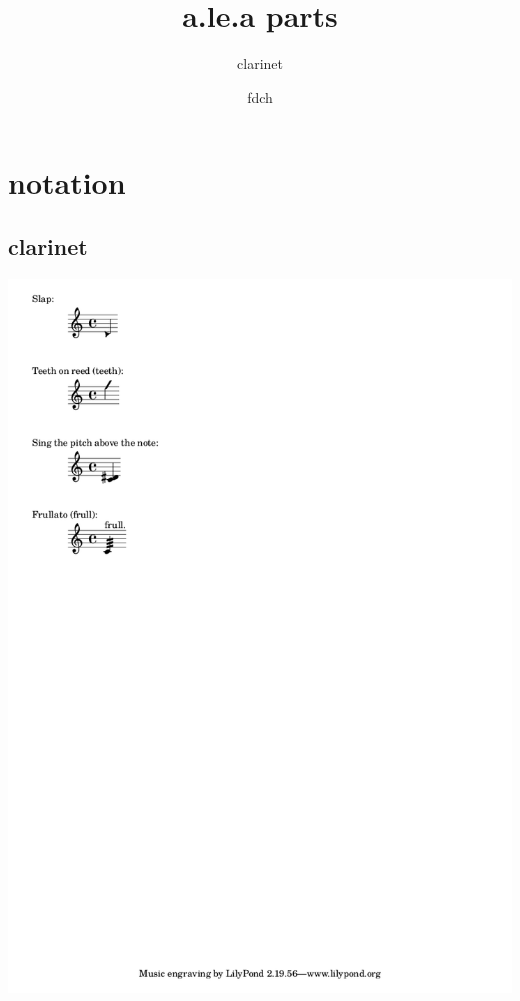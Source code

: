\documentclass[12pt, lettersize]{book}
\title{a.le.a parts}
\author{clarinet}
\date{fdch}
\begin{document}
\maketitle


\section{notation} \subsection{clarinet} \includegraphics[]{../../../../../reference/clarinet-notation.png}

\newpage
\null
\thispagestyle{blank}
\newpage


\end{document}
